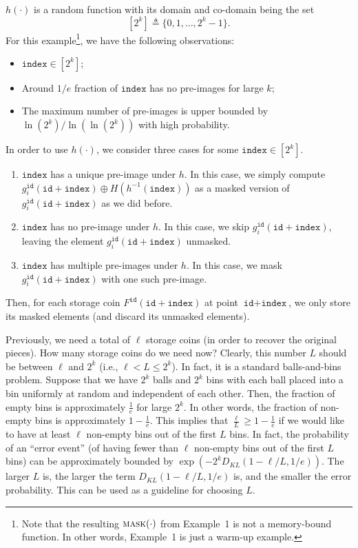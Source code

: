 \documentclass[12pt,draftcls,onecolumn]{IEEEtran}
\newcommand{\id}{\texttt{id}}
\newcommand{\ind}{\texttt{index}}
\newcommand{\mask}{\textsc{mask}}
\begin{document}
 $h(\cdot)$ is a random function with its domain and co-domain being the set
\[
[2^k] \triangleq \{ 0, 1, \ldots, 2^k - 1  \}.
\]
For this example\footnote{Note that the resulting $\mask(\cdot)$ from Example~1 is not a memory-bound function. In other words, Example~1 is just a warm-up example.}, we have the following observations:
\begin{itemize}
    \item $\ind \in [2^k]$;
    \item Around $1/e$ fraction of $\ind$ has no pre-images for large $k$;
    \item The maximum number of pre-images is upper bounded by $\ln(2^k)/\ln\left( \ln(2^k) \right)$ with high probability.
\end{itemize}

In order to use $h(\cdot)$, we consider three cases for some $\ind \in [2^k]$.
\begin{enumerate}
    \item $\ind$ has a unique pre-image under $h$. In this case, we simply compute $g_i^{\id}(\id + \ind) \oplus H\left( h^{-1}(\ind) \right)$ as a masked version of $g_i^{\id}(\id + \ind)$ as we did before.
    \item $\ind$ has no pre-image under $h$. In this case, we skip $g_i^{\id}(\id + \ind)$, leaving the element $g_i^{\id}(\id + \ind)$ unmasked.
    \item $\ind$ has multiple pre-images under $h$. In this case, we mask $g_i^{\id}(\id + \ind)$ with one such pre-image.
\end{enumerate}
Then, for each storage coin $F^{\id}(\id + \ind)$ at point $\id + \ind$, we only store its masked elements (and discard its unmasked elements).

Previously, we need a total of $\ell$ storage coins (in order to recover the original pieces). How many storage coins do we need now?
Clearly, this number $L$ should be between $\ell$ and $2^k$ (i.e., $\ell < L \le 2^k$).
In fact, it is a standard balls-and-bins problem. 
Suppose that we have $2^k$ balls and $2^k$ bins with each ball placed into a bin uniformly at random and independent of each other.
Then, the fraction of empty bins is approximately $\frac{1}{e}$ for large $2^k$.
In other words, the fraction of non-empty bins is approximately $1 - \frac{1}{e}$.
This implies that $\frac{\ell}{L} \ge 1 - \frac{1}{e}$ if we would like to have at least $\ell$ non-empty bins out of the first $L$ bins. 
In fact, the probability of an ``error event'' (of having fewer than $\ell$ non-empty bins out of the first $L$ bins) can be approximately bounded by $\exp\left(- 2^k D_{KL}(1 - \ell/L, 1/e) \right)$. The larger $L$ is, the larger the term $D_{KL}(1 - \ell/L, 1/e)$ is, and the smaller the error probability.
This can be used as a guideline for choosing $L$.
\end{document}
